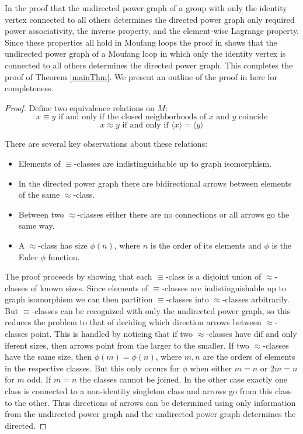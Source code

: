 \documentclass[12pt]{report}
\theoremstyle{definition}
\begin{document}
  In \cite{PGII} the proof that the undirected power graph of a group with only the identity vertex
    connected to all others determines the directed power graph only required power associativity,
    the inverse property, and the element-wise Lagrange property. Since these properties all hold in
    Moufang loops the proof in \cite{PGII} shows that the undirected power graph of a Moufang loop in
    which only the identity vertex is connected to all others determines the directed power graph.
    This completes the proof of Theorem \ref{mainThm}. We present an outline of the proof in
    \cite{PGII} here for completeness.

\begin{proof}
  Define two equivalence relations on $M$:
    \[x\equiv y\text{ if and only if the closed neighborhoods of $x$ and $y$ coincide}\]
    \[x\approx y\text{ if and only if }\langle x\rangle = \langle y\rangle\]

  There are several key observations about these relations:
  \begin{itemize}
    \item Elements of $\equiv$-classes are indistinguishable up to graph isomorphism.
    \item In the directed power graph there are bidirectional arrows between elements of
      the same $\approx$-class.
    \item Between two $\approx$-classes either there are no connections or all arrows go the same way.
    \item A $\approx$-class has size $\phi(n)$, where $n$ is the order of its elements and $\phi$
      is the Euler $\phi$ function.
  \end{itemize}
  The proof proceeds by showing that each $\equiv$-class is a disjoint union of $\approx$-classes
    of known sizes. Since elements of $\equiv$-classes are indistinguishable up to graph isomorphism
    we can then partition $\equiv$-classes into $\approx$-classes arbitrarily. But $\equiv$-classes
    can be recognized with only the undirected power graph, so this reduces the problem to that of
    deciding which direction arrows between $\approx$-classes point. This is handled by noticing that
    if two $\approx$-classes have dif and only iferent sizes, then arrows point from the larger to the smaller.
    If two $\approx$-classes have the same size, then $\phi(m) = \phi(n)$, where $m, n$ are the orders
    of elements in the respective classes. But this only occurs for $\phi$ when either $m = n$ or
    $2m = n$ for $m$ odd. If $m = n$ the classes cannot be joined. In the other case exactly one class
    is connected to a non-identity singleton class and arrows go from this class to the other. Thus
    directions of arrows can be determined using only information from the undirected power graph and
    the undirected power graph determines the directed.
\end{proof}
\end{document}
